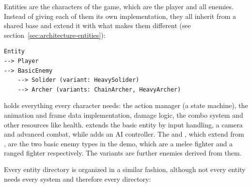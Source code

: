 \documentclass[../Main.tex]{subfiles}
\begin{document}
Entities are the characters of the game, which are the player and all enemies. Instead of giving each of them its own implementation, they all inherit from a shared base and extend it with what makes them different (see section~\ref{sec:architecture-entities}):

\begin{verbatim}
Entity
--> Player
--> BasicEnemy
    --> Solider (variant: HeavySolider)
    --> Archer (variants: ChainArcher, HeavyArcher)
\end{verbatim}

 holds everything every character needs: the action manager (a state machine), the animation and frame data implementation, damage logic, the combo system and other resources like health.  extends the basic entity by input handling, a camera and advanced combat, while  adds an AI controller. The  and , which extend from , are the two basic enemy types in the demo, which are a melee fighter and a ranged fighter respectively. The variants are further enemies derived from them.

Every entity directory is organized in a similar fashion, although not every entity needs every system and therefore every directory:
\end{document}
